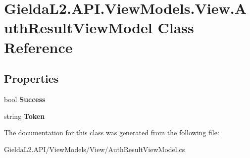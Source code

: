 \hypertarget{class_gielda_l2_1_1_a_p_i_1_1_view_models_1_1_view_1_1_auth_result_view_model}{}\section{Gielda\+L2.\+A\+P\+I.\+View\+Models.\+View.\+Auth\+Result\+View\+Model Class Reference}
\label{class_gielda_l2_1_1_a_p_i_1_1_view_models_1_1_view_1_1_auth_result_view_model}
\subsection*{Properties}
\begin{DoxyCompactItemize}
\item 
\mbox{\label{class_gielda_l2_1_1_a_p_i_1_1_view_models_1_1_view_1_1_auth_result_view_model_a68049f17284f2a8dbe1642707f494f15}} 
bool {\bfseries Success}
\item 
\mbox{\label{class_gielda_l2_1_1_a_p_i_1_1_view_models_1_1_view_1_1_auth_result_view_model_a49b069a1fbaa0fb7b25ea43e8db1a1a9}} 
string {\bfseries Token}
\end{DoxyCompactItemize}


The documentation for this class was generated from the following file\+:\begin{DoxyCompactItemize}
\item 
Gielda\+L2.\+A\+P\+I/\+View\+Models/\+View/Auth\+Result\+View\+Model.\+cs\end{DoxyCompactItemize}
